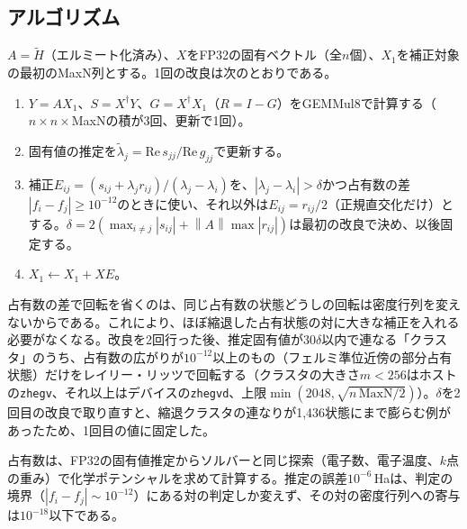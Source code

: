 \documentclass[a4paper,11pt]{ltjsarticle}
\newcommand{\code}[1]{\texttt{#1}}
\newcommand{\norm}[1]{\left\lVert#1\right\rVert}
\begin{document}
\subsection{アルゴリズム}
$A=\tilde H$（エルミート化済み）、$X$をFP32の固有ベクトル（全$n$個）、$X_1$を補正対象の最初のMaxN列とする。1回の改良は次のとおりである。
\begin{enumerate}
\item $Y=AX_1$、$S=X^{\dagger}Y$、$G=X^{\dagger}X_1$（$R=I-G$）をGEMMul8で計算する（$n\times n\times$MaxNの積が3回、更新で1回）。
\item 固有値の推定を$\tilde\lambda_j=\mathrm{Re}\,s_{jj}/\mathrm{Re}\,g_{jj}$で更新する。
\item 補正$E_{ij}=(s_{ij}+\lambda_j r_{ij})/(\lambda_j-\lambda_i)$を、$|\lambda_j-\lambda_i|>\delta$かつ占有数の差$|f_i-f_j|\ge10^{-12}$のときに使い、それ以外は$E_{ij}=r_{ij}/2$（正規直交化だけ）とする。$\delta=2(\max_{i\ne j}|s_{ij}|+\norm{A}\max|r_{ij}|)$は最初の改良で決め、以後固定する。
\item $X_1\leftarrow X_1+XE$。
\end{enumerate}
占有数の差で回転を省くのは、同じ占有数の状態どうしの回転は密度行列を変えないからである。これにより、ほぼ縮退した占有状態の対に大きな補正を入れる必要がなくなる。改良を2回行った後、推定固有値が$30\delta$以内で連なる「クラスタ」のうち、占有数の広がりが$10^{-12}$以上のもの（フェルミ準位近傍の部分占有状態）だけをレイリー・リッツで回転する（クラスタの大きさ$m<256$はホストの\code{zhegv}、それ以上はデバイスの\code{zhegvd}、上限$\min(2048,\sqrt{n\,\mathrm{MaxN}/2})$）。$\delta$を2回目の改良で取り直すと、縮退クラスタの連なりが1,436状態にまで膨らむ例があったため、1回目の値に固定した。

占有数は、FP32の固有値推定からソルバーと同じ探索（電子数、電子温度、$k$点の重み）で化学ポテンシャルを求めて計算する。推定の誤差$10^{-6}$\,Haは、判定の境界（$|f_i-f_j|\sim10^{-12}$）にある対の判定しか変えず、その対の密度行列への寄与は$10^{-18}$以下である。
\end{document}
